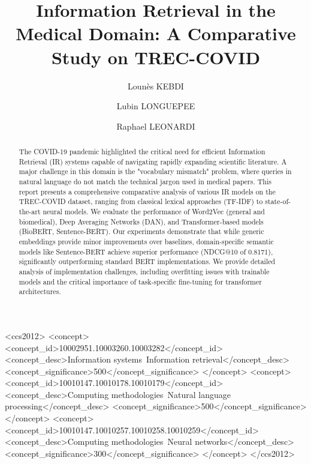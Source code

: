 \documentclass[sigconf,nonacm]{acmart}
\begin{document}
\title{Information Retrieval in the Medical Domain: A Comparative Study on TREC-COVID}

\author{Lounès KEBDI}

\author{Lubin LONGUEPEE}

\author{Raphael LEONARDI}

\begin{abstract}
The COVID-19 pandemic highlighted the critical need for efficient Information Retrieval (IR) systems capable of navigating rapidly expanding scientific literature. A major challenge in this domain is the "vocabulary mismatch" problem, where queries in natural language do not match the technical jargon used in medical papers. This report presents a comprehensive comparative analysis of various IR models on the TREC-COVID dataset, ranging from classical lexical approaches (TF-IDF) to state-of-the-art neural models. We evaluate the performance of Word2Vec (general and biomedical), Deep Averaging Networks (DAN), and Transformer-based models (BioBERT, Sentence-BERT). Our experiments demonstrate that while generic embeddings provide minor improvements over baselines, domain-specific semantic models like Sentence-BERT achieve superior performance (NDCG@10 of 0.8171), significantly outperforming standard BERT implementations. We provide detailed analysis of implementation challenges, including overfitting issues with trainable models and the critical importance of task-specific fine-tuning for transformer architectures.
\end{abstract}

\begin{CCSXML}
<ccs2012>
<concept>
<concept_id>10002951.10003260.10003282</concept_id>
<concept_desc>Information systems~Information retrieval</concept_desc>
<concept_significance>500</concept_significance>
</concept>
<concept>
<concept_id>10010147.10010178.10010179</concept_id>
<concept_desc>Computing methodologies~Natural language processing</concept_desc>
<concept_significance>500</concept_significance>
</concept>
<concept>
<concept_id>10010147.10010257.10010258.10010259</concept_id>
<concept_desc>Computing methodologies~Neural networks</concept_desc>
<concept_significance>300</concept_significance>
</concept>
</ccs2012>
\end{CCSXML}
\end{document}
